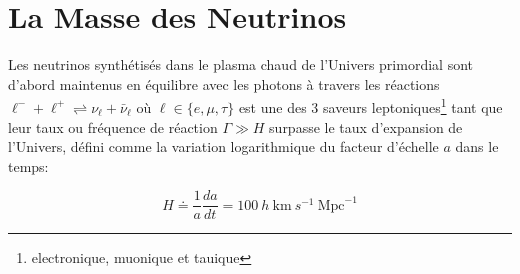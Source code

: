 \section{La Masse des Neutrinos}

Les neutrinos synthétisés dans le plasma chaud de l'Univers primordial sont d'abord maintenus en équilibre avec les photons à travers les réactions $\ell^{-} + \ell^{+} \rightleftharpoons \nu_\ell + \bar{\nu}_\ell$ où $\ell \in \lbrace e, \mu, \tau \rbrace$ est une des 3 saveurs leptoniques\footnote{electronique, muonique et tauique} tant que leur taux ou fréquence de réaction $\Gamma \gg H$ surpasse le taux d'expansion de l'Univers, défini comme la variation logarithmique du facteur d'échelle $a$ dans le temps:

\begin{equation}
H \doteq \frac{1}{a} \frac{d a}{d t} = 100~h~\mathrm{km}~s^{-1}~\mathrm{Mpc}^{-1}
\end{equation}

